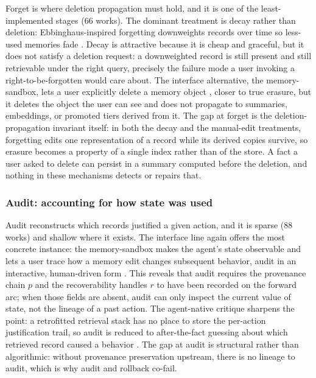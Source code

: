 Forget is where deletion propagation must hold, and it is one of the least-implemented stages ($66$ works). The dominant treatment is decay rather than deletion: Ebbinghaus-inspired forgetting downweights records over time so less-used memories fade \citep{zhong2023memorybankenhancinglargelanguage}. Decay is attractive because it is cheap and graceful, but it does not satisfy a deletion request: a downweighted record is still present and still retrievable under the right query, precisely the failure mode a user invoking a right-to-be-forgotten would care about. The interface alternative, the memory-sandbox, lets a user explicitly delete a memory object \citep{huang2023memorysandbox}, closer to true erasure, but it deletes the object the user can see and does not propagate to summaries, embeddings, or promoted tiers derived from it. The gap at forget is the deletion-propagation invariant itself: in both the decay and the manual-edit treatments, forgetting edits one representation of a record while its derived copies survive, so erasure becomes a property of a single index rather than of the store. A fact a user asked to delete can persist in a summary computed before the deletion, and nothing in these mechanisms detects or repairs that.

\subsubsection{Audit: accounting for how state was used}

Audit reconstructs which records justified a given action, and it is sparse ($88$ works) and shallow where it exists. The interface line again offers the most concrete instance: the memory-sandbox makes the agent's state observable and lets a user trace how a memory edit changes subsequent behavior, audit in an interactive, human-driven form \citep{huang2023memorysandbox}. This reveals that audit requires the provenance chain $p$ and the recoverability handles $r$ to have been recorded on the forward arc; when those fields are absent, audit can only inspect the current value of state, not the lineage of a past action. The agent-native critique sharpens the point: a retrofitted retrieval stack has no place to store the per-action justification trail, so audit is reduced to after-the-fact guessing about which retrieved record caused a behavior \citep{zhou2026agentnative}. The gap at audit is structural rather than algorithmic: without provenance preservation upstream, there is no lineage to audit, which is why audit and rollback co-fail.

